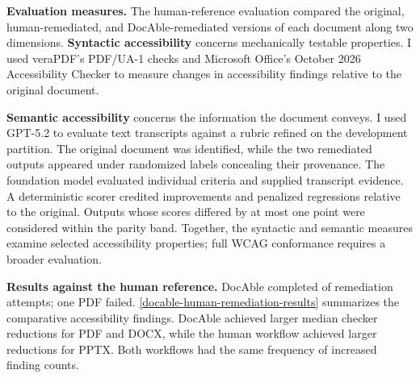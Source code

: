 
\textbf{Evaluation measures.} The human-reference evaluation compared the original, human-remediated, and DocAble-remediated versions of each document along two dimensions. \textbf{Syntactic accessibility} concerns mechanically testable properties. I used veraPDF's PDF/UA-1 checks and Microsoft Office's October 2026 Accessibility Checker to measure changes in accessibility findings relative to the original document.

\textbf{Semantic accessibility} concerns the information the document conveys. I used GPT-5.2 to evaluate text transcripts against a rubric refined on the development partition. The original document was identified, while the two remediated outputs appeared under randomized labels concealing their provenance. The foundation model evaluated individual criteria and supplied transcript evidence. A deterministic scorer credited improvements and penalized regressions relative to the original. Outputs whose scores differed by at most one point were considered within the parity band. Together, the syntactic and semantic measures examine selected accessibility properties; full WCAG conformance requires a broader evaluation.

\textbf{Results against the human reference.} DocAble completed  of  remediation attempts; one PDF failed. \autoref{docable-human-remediation-results} summarizes the comparative accessibility findings. DocAble achieved larger median checker reductions for PDF and DOCX, while the human workflow achieved larger reductions for PPTX. Both workflows had the same frequency of increased finding counts.

